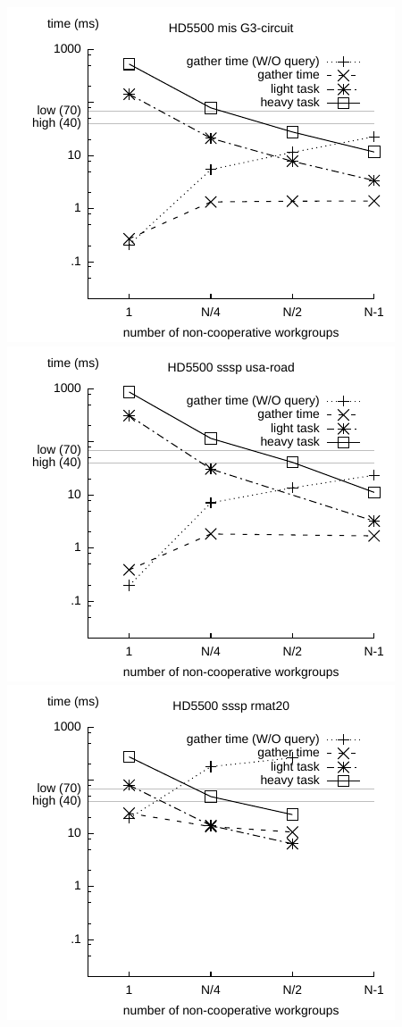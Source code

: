 \documentclass[sigconf]{acmart}
\begin{document}
{\includegraphics[width=.7\columnwidth]{images/barrier/hd5500_mis_G3_circuit.pdf} \\
\includegraphics[width=.7\columnwidth]{images/barrier/hd5500_sssp_usa_road.pdf} \\
\includegraphics[width=.7\columnwidth]{images/barrier/hd5500_sssp_rmat20.pdf} \\
}
\end{document}
